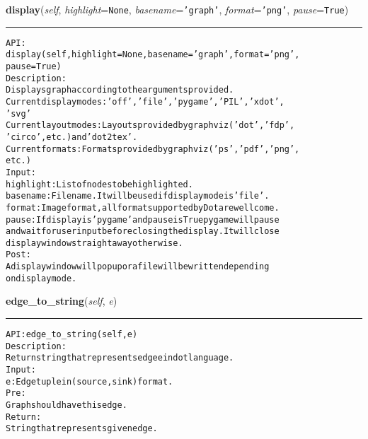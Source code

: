 \hspace{.8\funcindent}\begin{boxedminipage}{\funcwidth}

    \raggedright \textbf{display}(\textit{self}, \textit{highlight}={\tt None}, \textit{basename}={\tt \texttt{'}\texttt{graph}\texttt{'}}, \textit{format}={\tt \texttt{'}\texttt{png}\texttt{'}}, \textit{pause}={\tt True})

    \vspace{-1.5ex}

    \rule{\textwidth}{0.5\fboxrule}
\setlength{\parskip}{2ex}
\begin{alltt}

API:
    display(self, highlight = None, basename = 'graph', format = 'png',
        pause = True)
Description:
    Displays graph according to the arguments provided.
    Current display modes: 'off', 'file', 'pygame', 'PIL', 'xdot',
    'svg'
    Current layout modes: Layouts provided by graphviz ('dot', 'fdp',
    'circo', etc.) and 'dot2tex'.
    Current formats: Formats provided by graphviz ('ps', 'pdf', 'png',
    etc.)
Input:
    highlight: List of nodes to be highlighted.
    basename: File name. It will be used if display mode is 'file'.
    format: Image format, all format supported by Dot are wellcome.
    pause: If display is 'pygame' and pause is True pygame will pause
    and wait for user input before closing the display. It will close
    display window straightaway otherwise.
Post:
    A display window will pop up or a file will be written depending
    on display mode.
\end{alltt}

\setlength{\parskip}{1ex}
    \end{boxedminipage}

    \label{coinor:gimpy:graph:Graph:edge_to_string}

    \vspace{0.5ex}

\hspace{.8\funcindent}\begin{boxedminipage}{\funcwidth}

    \raggedright \textbf{edge\_to\_string}(\textit{self}, \textit{e})

    \vspace{-1.5ex}

    \rule{\textwidth}{0.5\fboxrule}
\setlength{\parskip}{2ex}
\begin{alltt}

API: edge\_to\_string(self, e)
Description:
Return string that represents edge e in dot language.
Input:
    e: Edge tuple in (source,sink) format.
Pre:
    Graph should have this edge.
Return:
    String that represents given edge.
\end{alltt}

\setlength{\parskip}{1ex}
    \end{boxedminipage}

